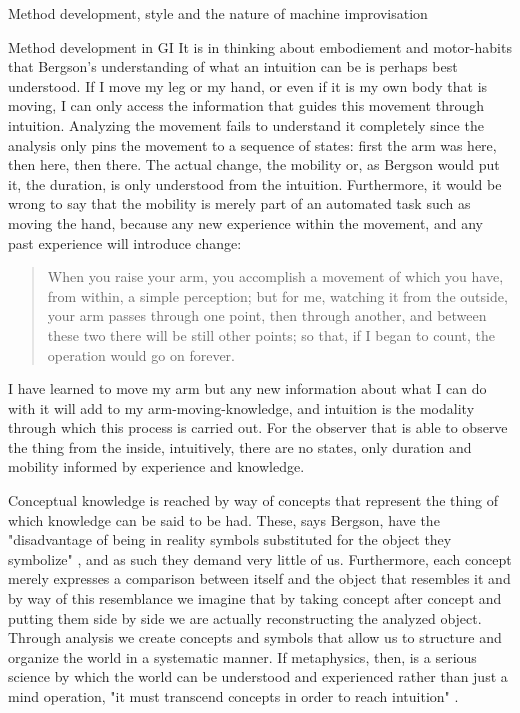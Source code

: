\documentclass[presentation]{beamer}
\begin{document}
\begin{frame}[label={sec:org08c5441}]{Method development, style and the nature of machine improvisation}
\begin{block}{Method development in GI}
It is in thinking about embodiement and motor-habits that Bergson's understanding of what an intuition can be is perhaps best understood. If I move my leg or my hand, or even if it is my own body that is moving, I can only access the information that guides this movement through intuition. Analyzing the movement fails to understand it completely since the analysis only pins the movement to a sequence of states: first the arm was here, then here, then there. The actual change, the mobility or, as Bergson would put it, the duration, is only understood from the intuition. Furthermore, it would be wrong to say that the mobility is merely part of an automated task such as moving the hand, because any new experience within the movement, and any past experience will introduce change:

\begin{quote}
When you raise your arm, you accomplish a movement of which you have, from within, a simple perception; but for me, watching it from the outside, your arm passes through one point, then through another, and between these two there will be still other points; so that, if I began to count, the operation would go on forever. \citep[p. 6]{Bergson1912}
\end{quote}

I have learned to move my arm but any new information about what I can do with it will add to my arm-moving-knowledge, and intuition is the modality through which this process is carried out. For the observer that is able to observe the thing from the inside, intuitively, there are no states, only duration and mobility informed by experience and knowledge. 

Conceptual knowledge is reached by way of concepts that represent the thing of which knowledge can be said to be had. These, says Bergson, have the "disadvantage of being in reality symbols substituted for the object they symbolize" \citep[p. 17]{Bergson1912}, and as such they demand very little of us. Furthermore, each concept merely expresses a comparison between itself and the object that resembles it and by way of this resemblance we imagine that by taking concept after concept and putting them side by side we are actually reconstructing the analyzed object. Through analysis we create concepts and symbols that allow us to structure and organize the world in a systematic manner. If metaphysics, then, is a serious science by which the world can be understood and experienced rather than just a mind operation, "it must transcend concepts in order to reach intuition" \citep[p.21]{Bergson1912}.  


\end{block}
\end{frame}
\end{document}
